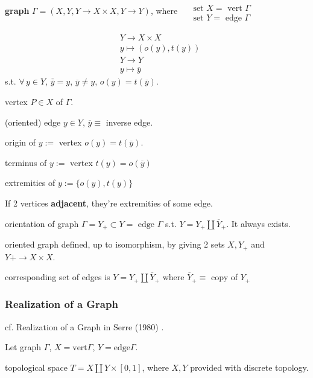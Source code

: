 \begin{definition}
	\textbf{graph} $\Gamma = (X,Y, Y\to X\times X, Y\to Y)$, where $\begin{aligned} & \quad \\
		& \text{ set } X = \text{ vert } \Gamma \\ 
		& \text{ set } Y = \text{ edge } \Gamma \end{aligned}$  

\[
\begin{aligned}
& Y \to X\times X \\ 
& y\mapsto (o(y), t(y)) \\
& Y\to Y \\
& y\mapsto \overline{y}
\end{aligned}
\]
s.t. $\forall \, y \in Y$, $\overline{ \overline{y}} = y$, $\overline{y} \neq y$, $o(y) = t(\overline{y})$.  

vertex $P \in X$ of $\Gamma$. 

(oriented) edge $y\in Y$, $\overline{y} \equiv $ inverse edge.  

origin of $y := $ vertex $o(y) = t(\overline{y})$.  

terminus of $y:= $ vertex $t(y) = o(\overline{y})$   

extremities of $y:= \lbrace o(y),t(y)\rbrace$  

If 2 vertices \textbf{adjacent}, they're extremities of some edge.  

orientation of graph $\Gamma = Y_+ \subset Y = \text{ edge } \Gamma$ s.t. $Y = Y_+ \coprod \overline{Y}_+$.  It always exists.  

oriented graph defined, up to isomorphism, by giving 2 sets $X,Y_+$ and $Y+ \to X\times X$.  
	
	corresponding set of edges is $Y = Y_+\coprod \overline{Y}_+$ where $\overline{Y}_+ \equiv $ copy of $Y_+$  
\end{definition}

\subsubsection{Realization of a Graph}

cf. Realization of a Graph in Serre (1980) \cite{agat:Serr1980}.  

Let graph $\Gamma$, $X = \text{vert}\Gamma$, $Y = \text{edge}\Gamma$.

topological space $T = X \coprod Y \times [0,1]$, where $X,Y$ provided with discrete topology.  

